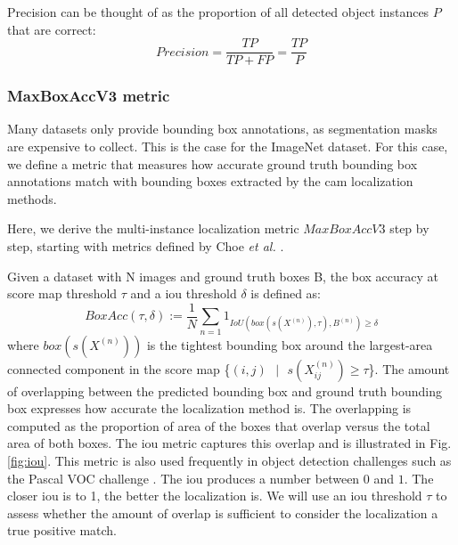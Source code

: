 Precision can be thought of as the proportion of all detected object instances $P$ that are correct:
\begin{equation} \label{eq:precision}
Precision = \frac{TP}{TP + FP} = \frac{TP}{P}
\end{equation}

\subsubsection{MaxBoxAccV3 metric} \label{sec:method_maxboxaccv3}
Many datasets only provide bounding box annotations, as segmentation masks are expensive to collect. This is the case for the ImageNet dataset. For this case, we define a metric that measures how accurate ground truth bounding box annotations match with bounding boxes extracted by the \acrshort{cam} localization methods.

Here, we derive the multi-instance localization metric $MaxBoxAccV3$ step by step, starting with metrics defined by Choe \textit{et al.} \cite{choe2020evaluating}.

Given a dataset with N images and ground truth boxes B, the box accuracy at score map threshold $\tau$ and a \acrshort{iou} threshold $\delta$ is defined as:
\begin{equation} \label{eq:boxacc}
    BoxAcc(\tau,\delta) := \frac{1}{N} \sum_{n=1}1_{IoU(box(s(X^{(n)}),\tau),B^{(n)})\ge\delta}
\end{equation}
where $box(s(X^{(n)}))$ is the tightest bounding box around the largest-area connected component in the score map \{$(i,j)\text{ }|\text{ }s(X^{(n)}_{ij}) \ge \tau$\}. The amount of overlapping between the predicted bounding box and ground truth bounding box expresses how accurate the localization method is. The overlapping is computed as the proportion of area of the boxes that overlap versus the total area of both boxes. The \acrfull{iou} metric captures this overlap and is illustrated in Fig. \ref{fig:iou}. This metric is also used frequently in object detection challenges such as the Pascal VOC challenge \cite{everingham2009pascal}. The \acrshort{iou} produces a number between $0$ and $1$. The closer \acrshort{iou} is to 1, the better the localization is. We will use an \acrshort{iou} threshold $\tau$ to assess whether the amount of overlap is sufficient to consider the localization a true positive match.

